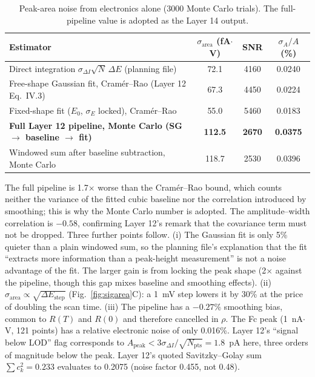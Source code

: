 \documentclass[10pt]{article}
\numberwithin{equation}{section}
\begin{document}
\begin{table}[h]
\centering\small
\begin{tabular}{@{}lccc@{}}
\toprule
Estimator & $\sigma_{\text{area}}$ (fA$\cdot$V) & SNR & $\sigma_A/A$ (\%) \\
\midrule
Direct integration $\sigma_{\Delta I}\sqrt{N}\,\Delta E$ (planning file) & 72.1 & 4160 & 0.0240 \\
Free-shape Gaussian fit, Cram\'er--Rao (Layer 12 Eq.\ IV.3) & 67.3 & 4450 & 0.0224 \\
Fixed-shape fit ($E_0$, $\sigma_E$ locked), Cram\'er--Rao & 55.0 & 5460 & 0.0183 \\
\textbf{Full Layer 12 pipeline, Monte Carlo (SG $\to$ baseline $\to$ fit)} & \textbf{112.5} & \textbf{2670} & \textbf{0.0375} \\
Windowed sum after baseline subtraction, Monte Carlo & 118.7 & 2530 & 0.0396 \\
\bottomrule
\end{tabular}
\caption{Peak-area noise from electronics alone (3000 Monte Carlo trials). The full-pipeline value is adopted as the Layer 14 output.}\label{tab:sigarea}
\end{table}

The full pipeline is 1.7$\times$ worse than the Cram\'er--Rao bound, which counts neither the variance of the fitted cubic baseline nor the correlation introduced by smoothing;
this is why the Monte Carlo number is adopted. The amplitude--width correlation is $-0.58$, confirming Layer 12's remark that the covariance term must not be dropped. Three further points follow.
(i) The Gaussian fit is only 5\% quieter than a plain windowed sum, so the planning file's explanation that the fit ``extracts more information than a peak-height measurement'' is not a noise advantage of the fit.
The larger gain is from locking the peak shape (2$\times$ against the pipeline, though this gap mixes baseline and smoothing effects). (ii) $\sigma_{\text{area}} \propto \sqrt{\Delta E_{\text{step}}}$
(Fig.~\ref{fig:sigarea}C): a 1~mV step lowers it by 30\% at the price of doubling the scan time. (iii) The pipeline has a $-0.27$\% smoothing bias, common to $R(T)$ and $R(0)$ and therefore cancelled in $\rho$.
The Fc peak (1~nA$\cdot$V, 121 points) has a relative electronic noise of only 0.016\%. Layer 12's ``signal below LOD'' flag corresponds to $A_{\text{peak}} < 3\sigma_{\Delta I}/\sqrt{N_{\text{pts}}} = 1.8$~pA here, three orders of magnitude below the peak.
Layer 12's quoted Savitzky--Golay \cite{sg} sum $\sum c_k^2 = 0.233$ evaluates to 0.2075 (noise factor 0.455, not 0.48).
\end{document}
